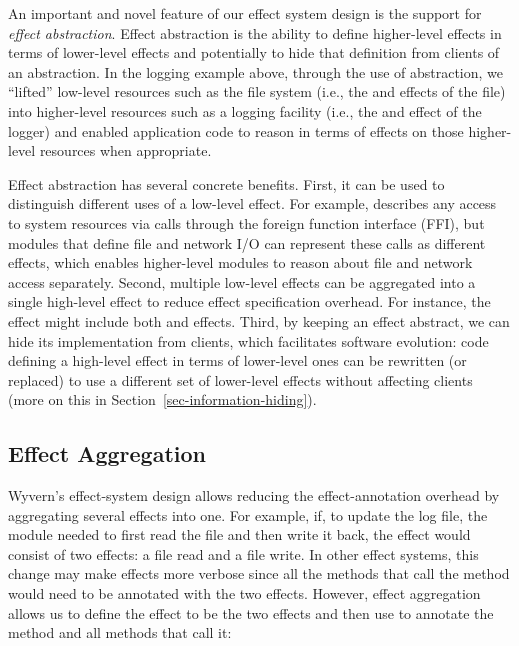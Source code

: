 An important and novel feature of our effect system design is the support for \textit{effect abstraction}. Effect abstraction is the ability to define higher-level effects in terms of lower-level effects and potentially to hide that definition from clients of an abstraction. In the logging example above, through the use of abstraction, we ``lifted'' low-level resources such as the file system (i.e., the  and  effects of the file) into higher-level resources such as a logging facility (i.e., the  and  effect of the logger) and enabled application code to reason in terms of effects on those higher-level resources when appropriate.

Effect abstraction has several concrete benefits. First, it can be used to distinguish different uses of a low-level effect. For example,  describes any access to system resources via calls through the foreign function interface (FFI), but modules that define file and network I/O can represent these calls as different effects, which enables higher-level modules to reason about file and network access separately. Second, multiple low-level effects can be aggregated into a single high-level effect to reduce effect specification overhead. For instance, the  effect might include both  and  effects. Third, by keeping an effect abstract, we can hide its implementation from clients, which facilitates software evolution: code defining a high-level effect in terms of lower-level ones can be rewritten (or replaced) to use a different set of lower-level effects without affecting clients (more on this in Section~\ref{sec-information-hiding}).


\subsection{Effect Aggregation}
\label{sec:effect-aggregation}

Wyvern's effect-system design allows reducing the effect-annotation overhead by aggregating several effects into one. For example, if, to update the log file, the  module needed to first read the file and then write it back, the  effect would consist of two effects: a file read and a file write. In other effect systems, this change may make effects more verbose since all the methods that call the  method would need to be annotated with the two effects. However, effect aggregation allows us to define the  effect to be the two effects and then use  to annotate the  method and all methods that call it:

